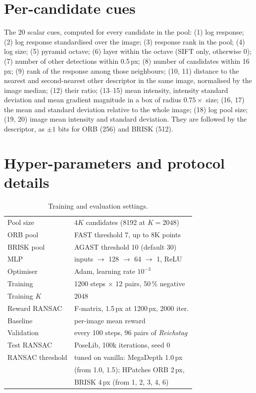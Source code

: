 \documentclass[10pt,twocolumn,letterpaper]{article}
\begin{document}
\section{Per-candidate cues}
\label{app:cues}
The 20 scalar cues, computed for every candidate in the pool:
(1) log response; (2) log response standardised over the image; (3) response rank in the pool;
(4) log size; (5) pyramid octave; (6) layer within the octave (SIFT only, otherwise 0);
(7) number of other detections within 0.5\,px; (8) number of candidates within 16\,px;
(9) rank of the response among those neighbours;
(10, 11) distance to the nearest and second-nearest other descriptor in the same image, normalised by
the image median; (12) their ratio;
(13--15) mean intensity, intensity standard deviation and mean gradient magnitude in a box of radius
$0.75\times$ size; (16, 17) the mean and standard deviation relative to the whole image;
(18) log pool size; (19, 20) image mean intensity and standard deviation.
They are followed by the descriptor, as $\pm1$ bits for ORB (256) and BRISK (512).

\section{Hyper-parameters and protocol details}
\label{app:hparams}
\begin{table}[h]
  \centering\small
  \begin{tabular}{ll}
    \toprule
    Pool size & $4K$ candidates (8192 at $K=2048$) \\
    ORB pool & FAST threshold 7, up to 8K points \\
    BRISK pool & AGAST threshold 10 (default 30) \\
    MLP & inputs $\to$ 128 $\to$ 64 $\to$ 1, ReLU \\
    Optimiser & Adam, learning rate $10^{-3}$ \\
    Training & 1200 steps $\times$ 12 pairs, 50\,\% negative \\
    Training $K$ & 2048 \\
    Reward RANSAC & F-matrix, 1.5\,px at 1200\,px, 2000 iter. \\
    Baseline & per-image mean reward \\
    Validation & every 100 steps, 96 pairs of \emph{Reichstag} \\
    Test RANSAC & PoseLib, 100k iterations, seed 0 \\
    RANSAC threshold & tuned on vanilla: MegaDepth 1.0\,px \\
                     & (from 1.0, 1.5); HPatches ORB 2\,px, \\
                     & BRISK 4\,px (from 1, 2, 3, 4, 6) \\
    \bottomrule
  \end{tabular}
  \caption{Training and evaluation settings.}
  \label{tab:hparams}
\end{table}
\end{document}
